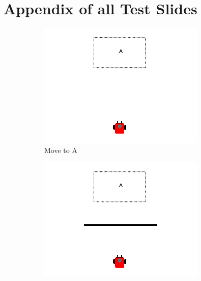 \documentclass[]{article}
\begin{document}



\section{Appendix of all Test Slides}
\begin{figure}
	\centering
	\begin{subfigure}{0.42\textwidth}
		\centering
		\includegraphics[width=\linewidth]{slide_images/Swarm_Robot_Control_-_Single_Robot_0003.png}
		\caption{Move to A}
		\label{fig:sub1}
	\end{subfigure}%
	\begin{subfigure}{0.42\textwidth}
		\centering
		\includegraphics[width=\linewidth]{slide_images/Swarm_Robot_Control_-_Single_Robot_0005.png}

\end{subfigure}
\end{figure}
\end{document}
